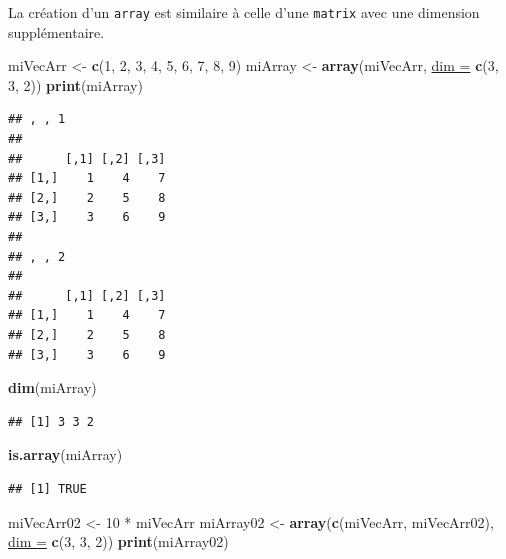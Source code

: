 \documentclass[twoside,symmetric]{book}
\newenvironment{Shaded}{}{}
\newcommand{\DataTypeTok}[1]{\underline{#1}}
\newcommand{\DecValTok}[1]{#1}
\newcommand{\KeywordTok}[1]{\textbf{#1}}
\newcommand{\NormalTok}[1]{#1}
\newcommand{\OperatorTok}[1]{#1}
\newcommand{\StringTok}[1]{#1}
\begin{document}
La création d'un \texttt{array} est similaire à celle d'une \texttt{matrix} avec une dimension supplémentaire.

\begin{Shaded}
\begin{Highlighting}[]
\NormalTok{miVecArr <-}\StringTok{ }\KeywordTok{c}\NormalTok{(}\DecValTok{1}\NormalTok{, }\DecValTok{2}\NormalTok{, }\DecValTok{3}\NormalTok{, }\DecValTok{4}\NormalTok{, }\DecValTok{5}\NormalTok{, }\DecValTok{6}\NormalTok{, }\DecValTok{7}\NormalTok{, }\DecValTok{8}\NormalTok{, }\DecValTok{9}\NormalTok{)}
\NormalTok{miArray <-}\StringTok{ }\KeywordTok{array}\NormalTok{(miVecArr, }\DataTypeTok{dim =} \KeywordTok{c}\NormalTok{(}\DecValTok{3}\NormalTok{, }\DecValTok{3}\NormalTok{, }\DecValTok{2}\NormalTok{))}
\KeywordTok{print}\NormalTok{(miArray)}
\end{Highlighting}
\end{Shaded}

\begin{verbatim}
## , , 1
## 
##      [,1] [,2] [,3]
## [1,]    1    4    7
## [2,]    2    5    8
## [3,]    3    6    9
## 
## , , 2
## 
##      [,1] [,2] [,3]
## [1,]    1    4    7
## [2,]    2    5    8
## [3,]    3    6    9
\end{verbatim}

\begin{Shaded}
\begin{Highlighting}[]
\KeywordTok{dim}\NormalTok{(miArray)}
\end{Highlighting}
\end{Shaded}

\begin{verbatim}
## [1] 3 3 2
\end{verbatim}

\begin{Shaded}
\begin{Highlighting}[]
\KeywordTok{is.array}\NormalTok{(miArray)}
\end{Highlighting}
\end{Shaded}

\begin{verbatim}
## [1] TRUE
\end{verbatim}

\begin{Shaded}
\begin{Highlighting}[]
\NormalTok{miVecArr02 <-}\StringTok{ }\DecValTok{10} \OperatorTok{*}\StringTok{ }\NormalTok{miVecArr}
\NormalTok{miArray02 <-}\StringTok{ }\KeywordTok{array}\NormalTok{(}\KeywordTok{c}\NormalTok{(miVecArr, miVecArr02), }\DataTypeTok{dim =} \KeywordTok{c}\NormalTok{(}\DecValTok{3}\NormalTok{, }\DecValTok{3}\NormalTok{, }\DecValTok{2}\NormalTok{))}
\KeywordTok{print}\NormalTok{(miArray02)}
\end{Highlighting}
\end{Shaded}
\end{document}
